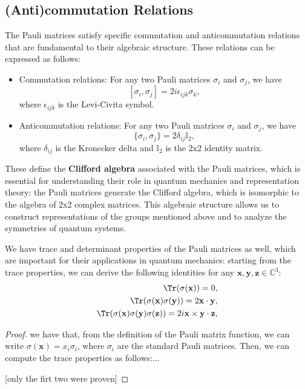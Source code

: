 \subsection{(Anti)commutation Relations}

The Pauli matrices satisfy specific commutation and anticommutation relations that are fundamental to their algebraic structure. These relations can be expressed as follows:
\begin{itemize}
    \item Commutation relations: For any two Pauli matrices \(\sigma_i\) and \(\sigma_j\), we have
          \[
              [\sigma_i, \sigma_j] = 2i \epsilon_{ijk} \sigma_k,
          \]
          where \(\epsilon_{ijk}\) is the Levi-Civita symbol.

    \item Anticommutation relations: For any two Pauli matrices \(\sigma_i\) and \(\sigma_j\), we have
          \[
              \{\sigma_i, \sigma_j\} = 2\delta_{ij} \mathbb{I}_2,
          \]
          where \(\delta_{ij}\) is the Kronecker delta and \(\mathbb{I}_2\) is the 2x2 identity matrix.
\end{itemize}

These define the \textbf{Clifford algebra} associated with the Pauli matrices, which is essential for understanding their role in quantum mechanics and representation theory: the Pauli matrices generate the Clifford algebra, which is isomorphic to the algebra of 2x2 complex matrices. This algebraic structure allows us to construct representations of the groups mentioned above and to analyze the symmetries of quantum systems.

We have trace and determinant properties of the Pauli matrices as well, which are important for their applications in quantum mechanics: starting from the trace properties, we can derive the following identities for any \(\mathbf{x}, \mathbf{y}, \mathbf{z} \in \mathbb{C}^3\):
\[
    \begin{aligned}
        \Tr (\sigma(\mathbf{x})) = 0,                                              \\
        \Tr(\sigma(\mathbf{x})\sigma(\mathbf{y})) = 2 \mathbf{x} \cdot \mathbf{y}, \\
        \Tr(\sigma(\mathbf{x})\sigma(\mathbf{y})\sigma(\mathbf{z})) = 2i \mathbf{x} \times \mathbf{y} \cdot \mathbf{z},
    \end{aligned}
\]
\begin{proof}
    we have that, from the definition of the Pauli matrix function, we can write \(\sigma(\mathbf{x}) = x_i \sigma_i\), where \(\sigma_i\) are the standard Pauli matrices. Then, we can compute the trace properties as follows:...

    [only the firt two were proven]
\end{proof}

